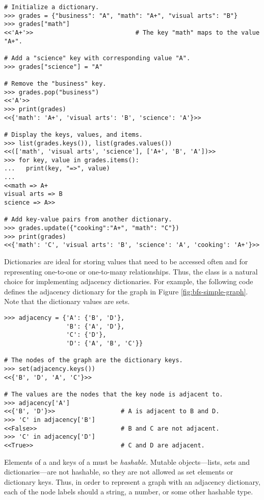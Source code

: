 \begin{lstlisting}
# Initialize a dictionary.
>>> grades = {"business": "A", "math": "A+", "visual arts": "B"}
>>> grades["math"]
<<'A+'>>                            # The key "math" maps to the value "A+".

# Add a "science" key with corresponding value "A".
>>> grades["science"] = "A"

# Remove the "business" key.
>>> grades.pop("business")
<<'A'>>
>>> print(grades)
<<{'math': 'A+', 'visual arts': 'B', 'science': 'A'}>>

# Display the keys, values, and items.
>>> list(grades.keys()), list(grades.values())
<<(['math', 'visual arts', 'science'], ['A+', 'B', 'A'])>>
>>> for key, value in grades.items():
...   print(key, "=>", value)
...
<<math => A+
visual arts => B
science => A>>

# Add key-value pairs from another dictionary.
>>> grades.update({"cooking":"A+", "math": "C"})
>>> print(grades)
<<{'math': 'C', 'visual arts': 'B', 'science': 'A', 'cooking': 'A+'}>>
\end{lstlisting}

Dictionaries are ideal for storing values that need to be accessed often and for representing one-to-one or one-to-many relationships.
Thus, the  class is a natural choice for implementing adjacency dictionaries.
For example, the following code defines the adjacency dictionary for the graph in Figure \ref{fig:bfs-simple-graph}.
Note that the dictionary values are sets.

\begin{lstlisting}
>>> adjacency = {'A': {'B', 'D'},
                 'B': {'A', 'D'},
                 'C': {'D'},
                 'D': {'A', 'B', 'C'}}

# The nodes of the graph are the dictionary keys.
>>> set(adjacency.keys())
<<{'B', 'D', 'A', 'C'}>>

# The values are the nodes that the key node is adjacent to.
>>> adjacency['A']
<<{'B', 'D'}>>                  # A is adjacent to B and D.
>>> 'C' in adjacency['B']
<<False>>                       # B and C are not adjacent.
>>> 'C' in adjacency['D']
<<True>>                        # C and D are adjacent.
\end{lstlisting}

\begin{warn} %
Elements of a  and keys of a  must be \emph{hashable}.
Mutable objects---lists, sets and dictionaries---are not hashable, so they are not allowed as set elements or dictionary keys.
Thus, in order to represent a graph with an adjacency dictionary, each of the node labels should a string, a number, or some other hashable type.
\end{warn}


